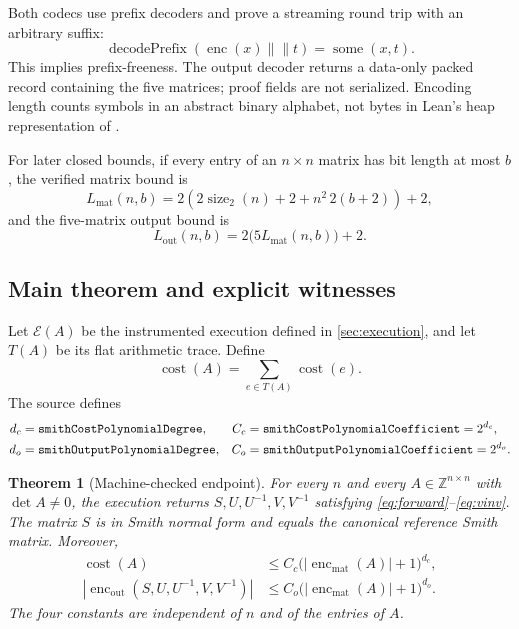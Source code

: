 \documentclass[11pt]{article}
\newtheorem{theorem}{Theorem}[section]
\theoremstyle{definition}
\newcommand{\Z}{\mathbb{Z}}
\newcommand{\natsize}{\operatorname{size}_2}
\newcommand{\enc}{\operatorname{enc}}
\newcommand{\cost}{\operatorname{cost}}
\newcommand{\code}[1]{\texttt{\detokenize{#1}}}
\newcommand{\mcode}[1]{\text{\ttfamily\detokenize{#1}}}
\newcommand{\concat}{\mathbin{\|\!\|}}
\begin{document}
Both codecs use prefix decoders and prove a streaming round trip with an arbitrary suffix:
\[
 \operatorname{decodePrefix}(\enc(x)\concat t)
   =\operatorname{some}(x,t).
\]
This implies prefix-freeness.  The output decoder returns a data-only packed record containing the five matrices; proof fields are not serialized.  Encoding length counts symbols in an abstract binary alphabet, not bytes in Lean's heap representation of \code{List Bool}.

For later closed bounds, if every entry of an $n\times n$ matrix has bit length at most $b$, the verified matrix bound is
\begin{equation}
  L_{\mathrm{mat}}(n,b)
   =2\left(2\natsize(n)+2+n^2\,2(b+2)\right)+2,
 \label{eq:matrixencodingbound}
\end{equation}
and the five-matrix output bound is
\begin{equation}
  L_{\mathrm{out}}(n,b)=2\bigl(5L_{\mathrm{mat}}(n,b)\bigr)+2.
 \label{eq:outputencodingbound}
\end{equation}

\subsection{Main theorem and explicit witnesses}

Let $\mathcal E(A)$ be the instrumented execution defined in \cref{sec:execution}, and let $T(A)$ be its flat arithmetic trace.  Define
\[
  \cost(A)=\sum_{e\in T(A)}\cost(e).
\]
The source defines
\begin{align*}
 d_c&=\mcode{smithCostPolynomialDegree}, &
 C_c&=\mcode{smithCostPolynomialCoefficient}=2^{d_c},\\
 d_o&=\mcode{smithOutputPolynomialDegree}, &
 C_o&=\mcode{smithOutputPolynomialCoefficient}=2^{d_o}.
\end{align*}

\begin{theorem}[Machine-checked endpoint]
\label{thm:main}
For every $n$ and every $A\in\Z^{n\times n}$ with $\det A\ne0$, the execution returns $S,U,U^{-1},V,V^{-1}$ satisfying \eqref{eq:forward}--\eqref{eq:vinv}.  The matrix $S$ is in Smith normal form and equals the canonical reference Smith matrix.  Moreover,
\begin{align}
  \cost(A)
   &\le C_c\bigl(|\enc_{\mathrm{mat}}(A)|+1\bigr)^{d_c},
      \label{eq:maincost}\\
  |\enc_{\mathrm{out}}(S,U,U^{-1},V,V^{-1})|
   &\le C_o\bigl(|\enc_{\mathrm{mat}}(A)|+1\bigr)^{d_o}.
      \label{eq:mainoutput}
\end{align}
The four constants are independent of $n$ and of the entries of $A$.
\end{theorem}
\end{document}
